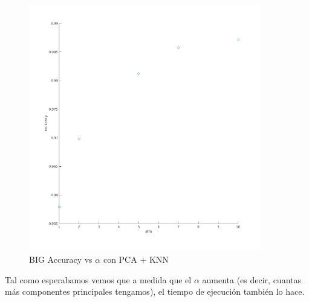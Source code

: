 \begin{figure}[H]
	\centering	\includegraphics[width=0.9\textwidth]{img/big_alfa_pca_accu.png}
	\caption{BIG Accuracy vs $\alpha$ con PCA + KNN}
	\label{fig: BIG Accuracy vs Alpha con KNN + PCA}
\end{figure}



Tal como esperabamos vemos que a medida que el $\alpha$ aumenta (es decir, cuantas más componentes principales tengamos), el tiempo de ejecución también lo hace.

